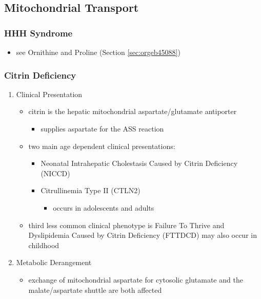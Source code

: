 \documentclass[12pt]{scrartcl}
\begin{document}
\begin{center}
\begin{center}
\subsection{Mitochondrial Transport}
\label{sec:org012fac0}
\subsubsection{HHH Syndrome}
\label{sec:orge8682af}
\begin{itemize}
\item see Ornithine and Proline (Section \ref{sec:orgeb45088})
\end{itemize}
\subsubsection{Citrin Deficiency}
\label{sec:orgfda6190}
\begin{enumerate}
\item Clinical Presentation
\label{sec:org1965b84}
\begin{itemize}
\item citrin is the hepatic mitochondrial aspartate/glutamate antiporter
\begin{itemize}
\item supplies aspartate for the ASS reaction
\end{itemize}
\item two main age dependent clinical presentations:
\begin{itemize}
\item Neonatal Intrahepatic Cholestasis Caused by Citrin Deficiency (NICCD)
\item Citrullinemia Type II (CTLN2)
\begin{itemize}
\item occurs in adolescents and adults
\end{itemize}
\end{itemize}
\item third less common clinical phenotype is Failure To Thrive and
Dyslipidemia Caused by Citrin Deficiency (FTTDCD) may also occur in
childhood
\end{itemize}

\item Metabolic Derangement
\label{sec:org956bad7}
\begin{itemize}
\item exchange of mitochondrial aspartate for cytosolic glutamate and
the malate/aspartate shuttle are both affected
\end{itemize}


\end{enumerate}
\end{center}
\end{center}
\end{document}
